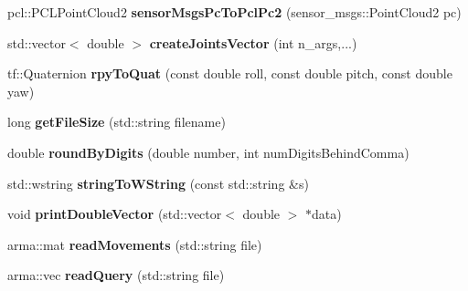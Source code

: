 \begin{DoxyCompactItemize}
\item 
\hypertarget{namespacekukadu_af44134c546de6ea5e498b083b8c131bc}{pcl\-::\-P\-C\-L\-Point\-Cloud2 {\bfseries sensor\-Msgs\-Pc\-To\-Pcl\-Pc2} (sensor\-\_\-msgs\-::\-Point\-Cloud2 pc)}\label{namespacekukadu_af44134c546de6ea5e498b083b8c131bc}

\item 
\hypertarget{namespacekukadu_a3252719e8d4e114800a6f2d058a5c005}{std\-::vector$<$ double $>$ {\bfseries create\-Joints\-Vector} (int n\-\_\-args,...)}\label{namespacekukadu_a3252719e8d4e114800a6f2d058a5c005}

\item 
\hypertarget{namespacekukadu_aae572ab857033784dd497034dfaf7dd3}{tf\-::\-Quaternion {\bfseries rpy\-To\-Quat} (const double roll, const double pitch, const double yaw)}\label{namespacekukadu_aae572ab857033784dd497034dfaf7dd3}

\item 
\hypertarget{namespacekukadu_a298b58c8a4f14a525e51794dd0a23d34}{long {\bfseries get\-File\-Size} (std\-::string filename)}\label{namespacekukadu_a298b58c8a4f14a525e51794dd0a23d34}

\item 
\hypertarget{namespacekukadu_a1296de8cc04a6c5b28d47722b6cbdb3f}{double {\bfseries round\-By\-Digits} (double number, int num\-Digits\-Behind\-Comma)}\label{namespacekukadu_a1296de8cc04a6c5b28d47722b6cbdb3f}

\item 
\hypertarget{namespacekukadu_af9fedac63f76b969c8264646b7abd405}{std\-::wstring {\bfseries string\-To\-W\-String} (const std\-::string \&s)}\label{namespacekukadu_af9fedac63f76b969c8264646b7abd405}

\item 
\hypertarget{namespacekukadu_a1de8efd2d11c3184e95d80f0652ec4b3}{void {\bfseries print\-Double\-Vector} (std\-::vector$<$ double $>$ $\ast$data)}\label{namespacekukadu_a1de8efd2d11c3184e95d80f0652ec4b3}

\item 
\hypertarget{namespacekukadu_af3958106c6520fae37b8668a56981a35}{arma\-::mat {\bfseries read\-Movements} (std\-::string file)}\label{namespacekukadu_af3958106c6520fae37b8668a56981a35}

\item 
\hypertarget{namespacekukadu_a6045b5e6eb7c8f49a0cab0e6fb09c129}{arma\-::vec {\bfseries read\-Query} (std\-::string file)}\label{namespacekukadu_a6045b5e6eb7c8f49a0cab0e6fb09c129}


\end{DoxyCompactItemize}

